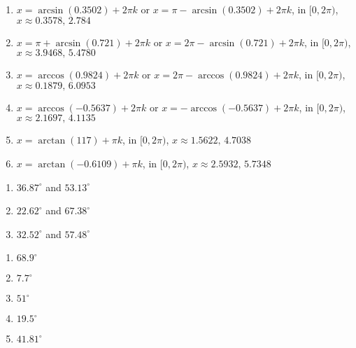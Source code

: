 \begin{enumerate}
\item $x = \arcsin(0.3502) + 2\pi k$ or $x = \pi - \arcsin(0.3502) + 2\pi k$, in  $[0, 2\pi)$, $x \approx 0.3578, \,2.784$

\item $x = \pi + \arcsin(0.721) + 2\pi k$ or $x = 2\pi - \arcsin(0.721) + 2\pi k$, in  $[0, 2\pi)$, $x \approx 3.9468, \, 5.4780$

\item $x = \arccos(0.9824) + 2\pi k$ or $x = 2\pi - \arccos(0.9824) + 2\pi k$, in  $[0, 2\pi)$, $x \approx 0.1879, \, 6.0953$

\item $x = \arccos(-0.5637) + 2\pi k$ or $x = - \arccos(-0.5637)  + 2\pi k$, in  $[0, 2\pi)$, $x \approx 2.1697, \, 4.1135$

\item $x = \arctan(117) + \pi k$, in  $[0, 2\pi)$, $x \approx 1.5622, \, 4.7038$

\item $x =  \arctan(-0.6109) + \pi k$, in  $[0, 2\pi)$, $x \approx 2.5932, \, 5.7348$

\setcounter{HW}{\value{enumi}}

\end{enumerate}

\begin{multicols}{3}

\begin{enumerate}

\setcounter{enumi}{\value{HW}}

\item $36.87^{\circ}$ and $53.13^{\circ}$
\item $22.62^{\circ}$ and $67.38^{\circ}$
\item $32.52^{\circ}$ and $57.48^{\circ}$

\setcounter{HW}{\value{enumi}}

\end{enumerate}

\end{multicols}

\begin{multicols}{5}

\begin{enumerate}

\setcounter{enumi}{\value{HW}}

\item $68.9^{\circ}$

\item $7.7^{\circ}$

\item $51^{\circ}$

\item $19.5^{\circ}$

\item  $41.81^{\circ}$

\setcounter{HW}{\value{enumi}}

\end{enumerate}

\end{multicols}

